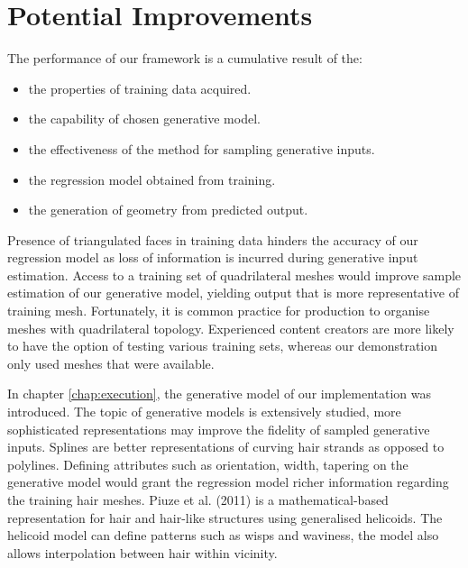 \documentclass[ %
author={Dillon Keith Diep},
supervisor={Dr. Carl Henrik Ek},
degree={MEng},
title={ART-CG Hair:},
subtitle={Assisted Real-time Content Generation of Stylised Virtual Hair},
type={Research},
year={2017} ]{dissertation}
\begin{document}
\section{Potential Improvements}
The performance of our framework is a cumulative result of the: 
\begin{itemize}
\item the properties of training data acquired.
\item the capability of chosen generative model.
\item the effectiveness of the method for sampling generative inputs.
\item the regression model obtained from training.
\item the generation of geometry from predicted output.
\end{itemize}

Presence of triangulated faces in training data hinders the accuracy of our regression model as loss of information is incurred during generative input estimation. Access to a training set of quadrilateral meshes would improve sample estimation of our generative model, yielding output that is more representative of training mesh. Fortunately, it is common practice for production to organise meshes with quadrilateral topology. Experienced content creators are more likely to have the option of testing various training sets, whereas our demonstration only used meshes that were available.

In chapter \ref{chap:execution}, the generative model of our implementation was introduced. The topic of generative models is extensively studied, more sophisticated representations may improve the fidelity of sampled generative inputs. Splines are better representations of curving hair strands as opposed to polylines. Defining attributes such as orientation, width, tapering on the generative model would grant the regression model richer information regarding the training hair meshes. Piuze et al. (2011) \cite{helicoidhair} is a mathematical-based representation for hair and hair-like structures using generalised helicoids. The helicoid model can define patterns such as wisps and waviness, the model also allows interpolation between hair within vicinity.
\end{document}
